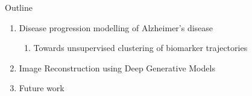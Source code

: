 \documentclass[8pt,xcolor=table,aspectratio=169]{beamer}
\begin{document}
\begin{frame}{Outline}




\begin{enumerate}
 \item Disease progression modelling of Alzheimer's disease 
 \begin{enumerate} 
  \item Towards unsupervised clustering of biomarker trajectories\\
 \end{enumerate}
   
 
  
  \vt

 \item Image Reconstruction using Deep Generative Models\\
\brgmoursshort
\vt
 
  \item Future work\\

\end{enumerate}
 


\end{frame}
\end{document}
